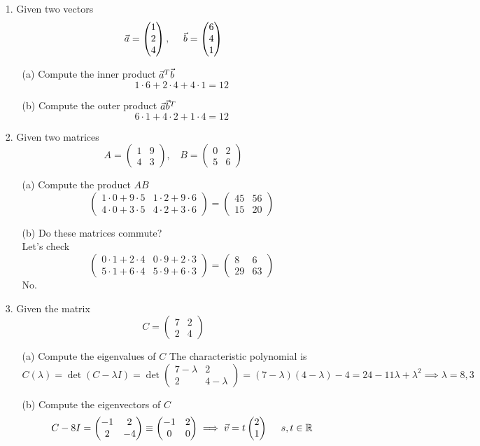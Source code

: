 \documentclass[english, 11pt]{article}
\newcommand{\mtx}[1]{\left(\begin{matrix}#1\end{matrix}\right)}
\begin{document}
     \begin{itemize}
       \item[1.] Given two vectors
       \[ \va = \mtx{1 \\ 2 \\ 4}, \ \ \ \  \vb = \mtx{6 \\ 4 \\ 1} \]
       \begin{itemize}
         \item[(a)] Compute the inner product $\vec{a}^T\vec{b}$ \\
           \[ 1\cdot6 + 2\cdot4 + 4\cdot 1 = 12 \]
         \item[(b)] Compute the outer product $\vec{a}\vec{b}^T$
           \[ 6 \cdot 1 + 4\cdot2 + 1\cdot4 = 12 \]
       \end{itemize}
       \item[2.] Given two matrices
       \[ A = \mtx{1 & 9 \\ 4 & 3}, \ \ \ \ B = \mtx{0 & 2 \\ 5 & 6} \]
       \begin{itemize}
         \item[(a)] Compute the product $AB$
           \[ \mtx{1\cdot0 + 9\cdot5 & 1 \cdot2 + 9\cdot 6 \\ 4 \cdot 0 + 3 \cdot 5 & 4 \cdot 2 + 3 \cdot 6} = \mtx{45 & 56 \\ 15 & 20}\]
         \item[(b)] Do these matrices commute? \\
           Let's check
           \[ \mtx{ 0 \cdot 1 + 2 \cdot 4 & 0 \cdot 9 + 2 \cdot 3 \\ 5\cdot1 + 6 \cdot 4 &  5 \cdot 9 + 6\cdot 3 } = \mtx{8 & 6 \\ 29 & 63} \]
           No.
       \end{itemize}
       \item[3.] Given the matrix
       \[ C = \mtx{7 & 2 \\ 2 & 4} \]
       \begin{itemize}
         \item[(a)] Compute the eigenvalues of $C$
           The characteristic polynomial is
           \[ C(\lambda) = \det{(C - \lambda I)} = \det \mtx{7 - \lambda & 2 \\ 2 & 4 - \lambda} = (7-\lambda)(4-\lambda) - 4  = 24 -11\lambda + \lambda^2 \implies \lambda = 8, 3 \]
         \item[(b)] Compute the eigenvectors of $C$
           \[ C - 8I = \mtx{-1 & 2 \\ 2 & -4 } \equiv \mtx{-1 & 2 \\ 0 & 0} \implies \vv = t\mtx{2 \\ 1} \ \ \ \ s, t \in \R\]

\end{itemize}
\end{itemize}
\end{document}
